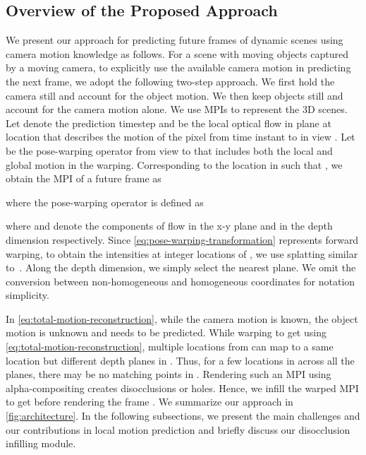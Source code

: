 \documentclass[preprint]{vgtc}
\begin{document}
    \subsection{Overview of the Proposed Approach}\label{subsec:overview}
    We present our approach for predicting future frames of dynamic scenes using camera motion knowledge as follows.
    For a scene with moving objects captured by a moving camera, to explicitly use the available camera motion in predicting the next frame, we adopt the following two-step approach.
    We first hold the camera still and account for the object motion.
    We then keep objects still and account for the camera motion alone.
    We use MPIs to represent the 3D scenes.
Let  denote the prediction timestep and  be the local optical flow in plane  at location  that describes the motion of the pixel from time instant  to  in view .
    Let  be the pose-warping operator from view  to  that includes both the local and global motion in the warping.
    Corresponding to the location  in  such that , we obtain the MPI  of a future frame  as
    
    where the pose-warping operator  is defined as
    
    where  and  denote the components of flow in the x-y plane and in the depth dimension respectively.
Since \autoref{eq:pose-warping-transformation} represents forward warping, to obtain the intensities at integer locations of , we use splatting similar to~\cite{tulsiani2018layer, kanchana2022ivp}.
    Along the depth dimension, we simply select the nearest plane.
    We omit the conversion between non-homogeneous and homogeneous coordinates for notation simplicity.

    In \autoref{eq:total-motion-reconstruction}, while the camera motion  is known, the object motion  is unknown and needs to be predicted.
    While warping  to get  using \autoref{eq:total-motion-reconstruction}, multiple locations from  can map to a same location but different depth planes in .
    Thus, for a few locations in  across all the planes, there may be no matching points in .
    Rendering such an MPI using alpha-compositing creates disocclusions or holes.
    Hence, we infill the warped MPI  to get  before rendering the frame .
    We summarize our approach in \autoref{fig:architecture}.
In the following subsections, we present the main challenges and our contributions in local motion prediction and briefly discuss our disocclusion infilling module.
\end{document}
